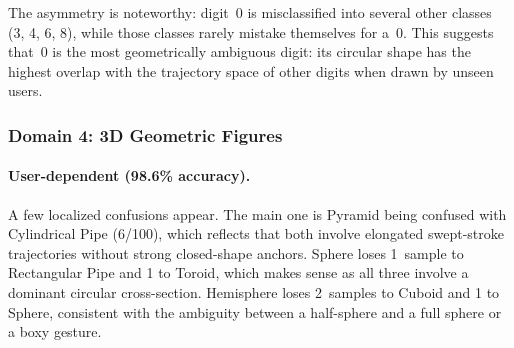 \begin{table}[H]
\centering
\caption{Confusion matrix -- Domain~1, user-independent (96.3\%).}
\label{tab:cm_d1_indep}
\end{table}

The asymmetry is noteworthy: digit~0 is misclassified into several other classes (3, 4, 6, 8), while those classes rarely mistake themselves for a~0. This suggests that~0 is the most geometrically ambiguous digit: its circular shape has the highest overlap with the trajectory space of other digits when drawn by unseen users.

\subsubsection{Domain 4: 3D Geometric Figures}

\paragraph{User-dependent (98.6\% accuracy).}
A few localized confusions appear. The main one is Pyramid being confused with Cylindrical Pipe (6/100), which reflects that both involve elongated swept-stroke trajectories without strong closed-shape anchors. Sphere loses 1~sample to Rectangular Pipe and 1 to Toroid, which makes sense as all three involve a dominant circular cross-section. Hemisphere loses 2~samples to Cuboid and 1 to Sphere, consistent with the ambiguity between a half-sphere and a full sphere or a boxy gesture.

